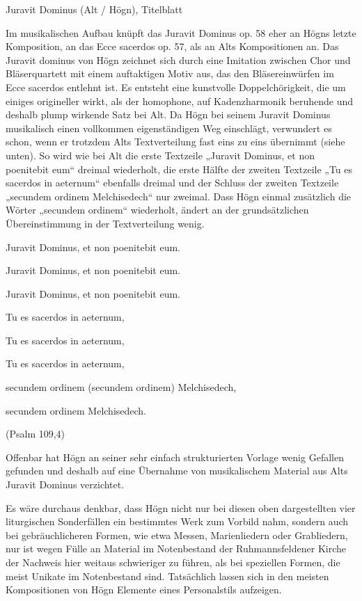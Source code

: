 \begin{figure}
\img{}
\caption{}
\end{figure}

Juravit Dominus (Alt / Högn),
Titelblatt

Im musikalischen Aufbau knüpft das Juravit Dominus op. 58 eher an Högns
letzte Komposition, an das Ecce sacerdos op. 57, als an Alts
Kompositionen an. Das Juravit dominus von Högn zeichnet sich durch eine
Imitation zwischen Chor und Bläserquartett mit einem auftaktigen Motiv
aus, das den Bläsereinwürfen im Ecce sacerdos entlehnt ist. Es entsteht
eine kunstvolle Doppelchörigkeit, die um einiges origineller wirkt, als
der homophone, auf Kadenzharmonik beruhende und deshalb plump wirkende
Satz bei Alt. Da Högn bei seinem Juravit Dominus musikalisch einen
vollkommen eigenständigen Weg einschlägt, verwundert es schon, wenn er
trotzdem Alts Textverteilung fast eins zu eins übernimmt (siehe unten).
So wird wie bei Alt die erste Textzeile „Juravit Dominus, et non
poenitebit eum“ dreimal wiederholt, die erste Hälfte der zweiten
Textzeile „Tu es sacerdos in aeternum“ ebenfalls dreimal und der
Schluss der zweiten Textzeile „secundem ordinem Melchisedech“ nur
zweimal. Dass Högn einmal zusätzlich die Wörter „secundem ordinem“
wiederholt, ändert an der grundsätzlichen Übereinstimmung in der
Textverteilung wenig.

Juravit Dominus, et non poenitebit eum.

Juravit Dominus, et non poenitebit eum.

Juravit Dominus, et non poenitebit eum.

Tu es sacerdos in aeternum,

Tu es sacerdos in aeternum,

Tu es sacerdos in aeternum,

secundem ordinem (secundem ordinem) Melchisedech,

secundem ordinem Melchisedech.

(Psalm 109,4)

Offenbar hat Högn an seiner sehr einfach strukturierten Vorlage wenig
Gefallen gefunden und deshalb auf eine Übernahme von musikalischem
Material aus Alts Juravit Dominus verzichtet.

Es wäre durchaus denkbar, dass Högn nicht nur bei diesen oben
dargestellten vier liturgischen Sonderfällen ein bestimmtes Werk zum
Vorbild nahm, sondern auch bei gebräuchlicheren Formen, wie etwa
Messen, Marienliedern oder Grabliedern, nur ist wegen Fülle an Material
im Notenbestand der Ruhmannsfeldener Kirche der Nachweis hier weitaus
schwieriger zu führen, als bei speziellen Formen, die meist Unikate im
Notenbestand sind. Tatsächlich lassen sich in den meisten Kompositionen
von Högn Elemente eines Personalstils aufzeigen.